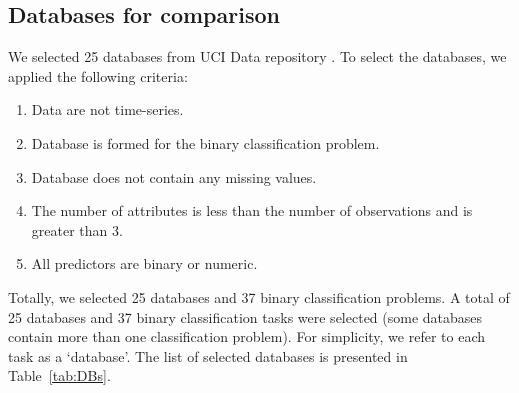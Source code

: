 \documentclass[entropy,article,submit,moreauthors,pdftex]{Definitions/mdpi}
\begin{document}
\subsection{Databases for comparison}

We selected 25 databases from UCI Data repository \cite{Dua2017}. To select the databases, we applied the following criteria:
\begin{enumerate}
  \item Data are not time-series.
  \item Database is formed for the binary classification problem.
  \item Database does not contain any missing values.
  \item The number of attributes is less than the number of observations and is greater than 3.
  \item All predictors are binary or numeric.
\end{enumerate}

Totally, we selected 25 databases and 37 binary classification problems.
A total of 25 databases and 37 binary classification tasks were selected (some databases contain more than one classification problem).
For simplicity, we refer to each task as a `database'. The  list of selected databases is presented in Table~\ref{tab:DBs}.
\end{document}
